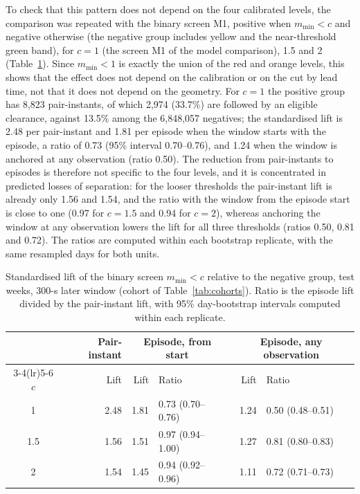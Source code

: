 \documentclass[aerospace,article,submit,moreauthors]{Definitions/mdpi}
\newcommand{\mmin}{m_{\min}}
\begin{document}
To check that this pattern does not depend on the four calibrated levels, the comparison was repeated with the binary screen M1, positive when $\mmin<c$ and negative otherwise (the negative group includes yellow and the near-threshold green band), for $c=1$ (the screen M1 of the model comparison), 1.5 and 2 (Table~\ref{tab:binary}). Since $\mmin<1$ is exactly the union of the red and orange levels, this shows that the effect does not depend on the calibration or on the cut by lead time, not that it does not depend on the geometry. For $c=1$ the positive group has 8,823 pair-instants, of which 2,974 (33.7\%) are followed by an eligible clearance, against 13.5\% among the 6,848,057 negatives; the standardised lift is 2.48 per pair-instant and 1.81 per episode when the window starts with the episode, a ratio of 0.73 (95\% interval 0.70--0.76), and 1.24 when the window is anchored at any observation (ratio 0.50). The reduction from pair-instants to episodes is therefore not specific to the four levels, and it is concentrated in predicted losses of separation: for the looser thresholds the pair-instant lift is already only 1.56 and 1.54, and the ratio with the window from the episode start is close to one (0.97 for $c=1.5$ and 0.94 for $c=2$), whereas anchoring the window at any observation lowers the lift for all three thresholds (ratios 0.50, 0.81 and 0.72). The ratios are computed within each bootstrap replicate, with the same resampled days for both units.

\begin{table}[t]
\caption{Standardised lift of the binary screen $\mmin<c$ relative to the negative group, test weeks, 300-s later window (cohort of Table~\ref{tab:cohorts}). Ratio is the episode lift divided by the pair-instant lift, with 95\% day-bootstrap intervals computed within each replicate.}\label{tab:binary}
\centering\small\setlength{\tabcolsep}{4pt}
\begin{tabular}{@{}crrlrl@{}}
\toprule
 & Pair-instant & \multicolumn{2}{c}{Episode, from start} & \multicolumn{2}{c}{Episode, any observation}\\
\cmidrule(lr){3-4}\cmidrule(lr){5-6}
$c$ & Lift & Lift & Ratio & Lift & Ratio\\
\midrule
1 & 2.48 & 1.81 & 0.73 (0.70--0.76) & 1.24 & 0.50 (0.48--0.51)\\
1.5 & 1.56 & 1.51 & 0.97 (0.94--1.00) & 1.27 & 0.81 (0.80--0.83)\\
2 & 1.54 & 1.45 & 0.94 (0.92--0.96) & 1.11 & 0.72 (0.71--0.73)\\
\bottomrule
\end{tabular}
\end{table}
\end{document}
